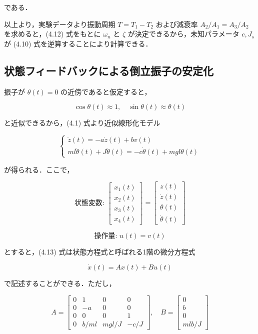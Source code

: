 である．

以上より，実験データより振動周期 \( T = T_1 - T_2 \) および減衰率 
\( A_2/A_1 = A_3/A_2 \) を求めると，(4.12) 式をもとに \( \omega_n \) と \( \zeta \) 
が決定できるから，未知パラメータ \( c, J_s \) が (4.10) 式を逆算することにより計算できる．

\subsection{状態フィードバックによる倒立振子の安定化}

振子が \( \theta(t) = 0 \) の近傍であると仮定すると，

\[
  \cos \theta(t) \approx 1, \quad \sin \theta(t) \approx \theta(t)
\]

と近似できるから，(4.1) 式より近似線形化モデル

\[
  \begin{cases}
    \ddot{z}(t) = -a\dot{z}(t) + bv(t) \\
    ml\ddot{\theta}(t) + J\ddot{\theta}(t) = -c\dot{\theta}(t) + mgl\theta(t)
  \end{cases} \tag{4.13}
\]

が得られる．ここで，


\[
  \text{状態変数: }
  \begin{bmatrix}
    x_1(t) \\
    x_2(t) \\
    x_3(t) \\
    x_4(t)
  \end{bmatrix}
  =
  \begin{bmatrix}
    z(t)       \\
    \dot{z}(t) \\
    \theta(t)  \\
    \dot{\theta}(t)
  \end{bmatrix}
\]

\[　\text{操作量: } u(t) = v(t) 　\]

とすると，(4.13) 式は状態方程式と呼ばれる1階の微分方程式

\[
  \dot{x}(t) = Ax(t) + Bu(t) \tag{4.14}
\]

で記述することができる．ただし，

\[
  A = \begin{bmatrix}
    0 & 1    & 0     & 0    \\
    0 & -a   & 0     & 0    \\
    0 & 0    & 0     & 1    \\
    0 & b/ml & mgl/J & -c/J
  \end{bmatrix}, \quad
  B = \begin{bmatrix}
    0 \\
    b \\
    0 \\
    mlb/J
  \end{bmatrix}
\]

